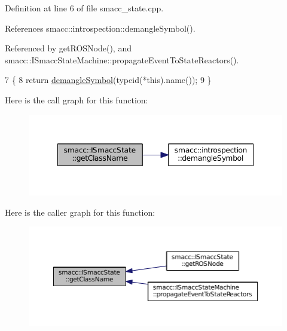 Definition at line 6 of file smacc\+\_\+state.\+cpp.



References smacc\+::introspection\+::demangle\+Symbol().



Referenced by get\+R\+O\+S\+Node(), and smacc\+::\+I\+Smacc\+State\+Machine\+::propagate\+Event\+To\+State\+Reactors().


\begin{DoxyCode}
7 \{
8     \textcolor{keywordflow}{return} \hyperlink{namespacesmacc_1_1introspection_a2f495108db3e57604d8d3ff5ef030302}{demangleSymbol}(\textcolor{keyword}{typeid}(*this).name());
9 \}
\end{DoxyCode}


Here is the call graph for this function\+:
\nopagebreak
\begin{figure}[H]
\begin{center}
\leavevmode
\includegraphics[width=348pt]{classsmacc_1_1ISmaccState_a5bf0b49d5ea6b9e8f45c26fa155b2664_cgraph}
\end{center}
\end{figure}




Here is the caller graph for this function\+:
\nopagebreak
\begin{figure}[H]
\begin{center}
\leavevmode
\includegraphics[width=350pt]{classsmacc_1_1ISmaccState_a5bf0b49d5ea6b9e8f45c26fa155b2664_icgraph}
\end{center}
\end{figure}


